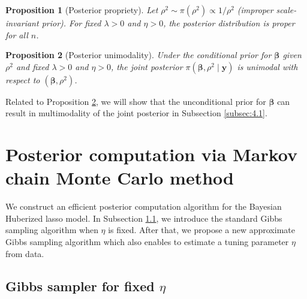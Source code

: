 \documentclass[11pt]{article}
\theoremstyle{plain}
\newtheorem{prop}{Proposition}[section]
\theoremstyle{definition}
\begin{document}
\begin{prop}[Posterior propriety]\label{propriety}
Let $\rho^2 \sim \pi(\rho^2) \propto 1/\rho^2$ (improper scale-invariant prior). For fixed $\lambda>0$ and $\eta>0$, the posterior distribution is proper for all $n$.
\end{prop}

\begin{prop}[Posterior unimodality]\label{unimodality}
Under the conditional prior for $\bm{\beta}$ given $\rho^2$ and fixed $\lambda>0$ and $\eta>0$, the joint posterior $\pi(\bm{\beta},\rho^2 \mid \bm{y})$ is unimodal with respect to $(\bm{\beta},\rho^2)$. 
\end{prop}
Related to Proposition \ref{unimodality}, we will show that the unconditional prior for $\bm{\beta}$ can result in multimodality of the joint posterior in Subsection \ref{subsec:4.1}.


\section{Posterior computation via Markov chain Monte Carlo method}
\label{sec:3}

We construct an efficient posterior computation algorithm for the Bayesian Huberized lasso model. In Subsection \ref{subsec:3.1}, we introduce the standard Gibbs sampling algorithm when $\eta$ is fixed. After that, we propose a new approximate Gibbs sampling algorithm which also enables to estimate a tuning parameter $\eta$ from data. 

\subsection{Gibbs sampler for fixed $\eta$}
\label{subsec:3.1}
\end{document}
